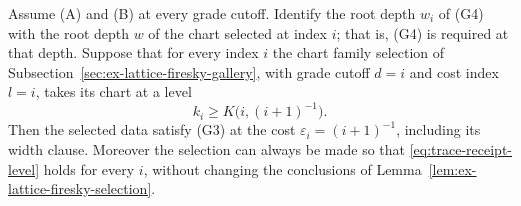 \begin{proposition}
\label{prop:trace-rounded-receipt}
Assume (A) and (B) at every grade cutoff. Identify the root depth $w_i$
of (G4) with the root depth $w$ of the chart selected at index $i$; that
is, (G4) is required at that depth. Suppose that for every index $i$ the
chart family selection of Subsection~\ref{sec:ex-lattice-firesky-gallery}, with
grade cutoff $d=i$ and cost index $l=i$, takes its chart at a level
\begin{equation}\label{eq:trace-receipt-level}
 k_i\ge K\bigl(i,(i+1)^{-1}\bigr).
\end{equation}
Then the selected data satisfy (G3) at the cost
$\varepsilon_i=(i+1)^{-1}$, including its width clause. Moreover
the selection can always be made so that \eqref{eq:trace-receipt-level}
holds for every $i$, without changing the conclusions of
Lemma~\ref{lem:ex-lattice-firesky-selection}.
\end{proposition}
